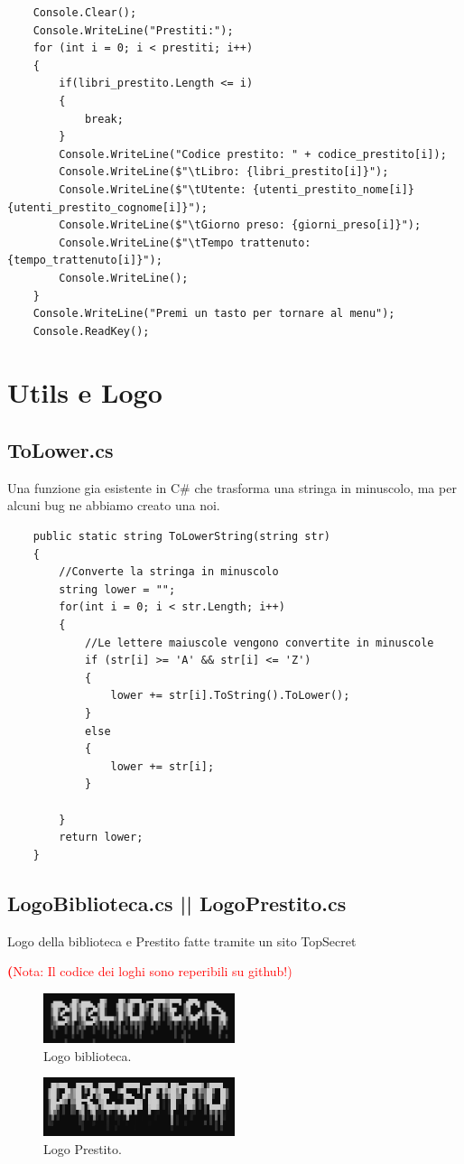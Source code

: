 \documentclass[a4paper,12pt]{article}
\begin{document}
\begin{lstlisting}
    Console.Clear();
    Console.WriteLine("Prestiti:");
    for (int i = 0; i < prestiti; i++)
    {
        if(libri_prestito.Length <= i)
        {
            break;
        }
        Console.WriteLine("Codice prestito: " + codice_prestito[i]);
        Console.WriteLine($"\tLibro: {libri_prestito[i]}");
        Console.WriteLine($"\tUtente: {utenti_prestito_nome[i]} {utenti_prestito_cognome[i]}");
        Console.WriteLine($"\tGiorno preso: {giorni_preso[i]}");
        Console.WriteLine($"\tTempo trattenuto: {tempo_trattenuto[i]}");
        Console.WriteLine();
    }
    Console.WriteLine("Premi un tasto per tornare al menu");
    Console.ReadKey();
\end{lstlisting}

\newpage

\section{Utils e Logo}
\subsection{ToLower.cs}
Una funzione gia esistente in C\# che trasforma una stringa in minuscolo, ma per alcuni bug ne abbiamo creato una noi.
\begin{lstlisting}
    public static string ToLowerString(string str)
    {
        //Converte la stringa in minuscolo
        string lower = "";
        for(int i = 0; i < str.Length; i++)
        {
            //Le lettere maiuscole vengono convertite in minuscole
            if (str[i] >= 'A' && str[i] <= 'Z')
            {
                lower += str[i].ToString().ToLower();
            }
            else
            {
                lower += str[i];
            }
                
        }
        return lower;
    }
\end{lstlisting}

\subsection{LogoBiblioteca.cs || LogoPrestito.cs}
Logo della biblioteca e Prestito fatte tramite un sito TopSecret

\textcolor{red}{\tiny{\textbf(Nota: Il codice dei loghi sono reperibili su github!)}}

\begin{figure}[h!]
    \centering
    \includegraphics[width=0.5\textwidth]{biblioteca.png}
    \caption{Logo biblioteca.}
    \label{fig:etichetta}
\end{figure}

\begin{figure}[h!]
    \centering
    \includegraphics[width=0.5\textwidth]{Prestito.png}
    \caption{Logo Prestito.}
    \label{fig:etichetta}
\end{figure}
\end{document}
